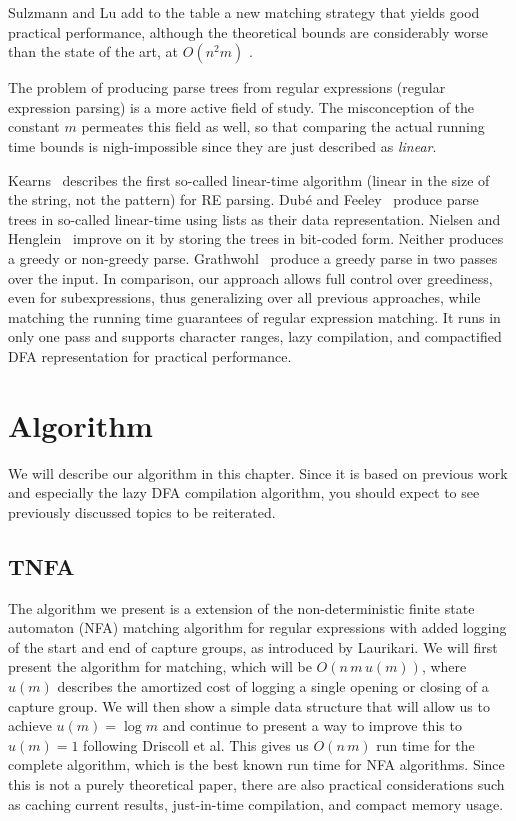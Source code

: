 \documentclass[11pt]{Thesis}
\theoremstyle{definition}
\newcommand{\seclabel}[1]{\label{sec:#1}}
\begin{document}
Sulzmann and Lu add to the table a new matching strategy that yields
good practical performance, although the theoretical bounds are considerably
worse than the state of the art, at $O(n^{2}m)$ \cite{Sulz12a}.

The problem of producing parse trees from regular expressions (regular 
expression parsing) is a more active field of study. The misconception of the 
constant $m$ permeates this field as well, so that comparing the actual 
running time bounds is nigh-impossible since they are just described as
\emph{linear}.

Kearns~\cite{Kear91a} describes the first so-called linear-time algorithm 
(linear in the size of the string, not the pattern) for RE parsing.  Dub\'e and
Feeley~\cite{Dube00a} produce parse trees in so-called linear-time using lists
as their data representation. Nielsen and Henglein~\cite{Niel11a} improve on it
by storing the trees in bit-coded form.  Neither produces a greedy or
non-greedy parse.  Grathwohl~\cite{Grat13a} produce a greedy parse in two
passes over the input.  In comparison, our approach allows full control over
greediness, even for subexpressions, thus generalizing over all previous
approaches, while matching the running time guarantees of regular expression
matching. It runs in only one pass and supports character ranges, lazy
compilation, and compactified DFA representation for practical performance.

\chapter{Algorithm} \seclabel{algo}
We will describe our algorithm in this chapter. Since it is based on previous 
work and especially the lazy DFA compilation algorithm, you should expect to 
see previously discussed topics to be reiterated.

\section{TNFA}\label{sec:tnfa}

The algorithm we present is a extension of the non-deterministic finite state
automaton (NFA) matching algorithm for regular expressions with added logging
of the start and end of capture groups, as introduced by
Laurikari\cite{Laur00a}. We will first present the algorithm for matching,
which will be $O(n\, m\, u(m))$, where $u(m)$ describes the amortized cost of
logging a single opening or closing of a capture group. We will then show a
simple data structure that will allow us to achieve $u(m) = \log m$ and
continue to present a way to improve this to $u(m) = 1$ following Driscoll et
al\cite{Dris89a}. This gives us $O(n\, m)$ run time for the
complete algorithm, which is the best known run time for NFA algorithms. Since
this is not a purely theoretical paper, there are also practical considerations
such as caching current results, just-in-time compilation, and compact memory
usage.
\end{document}
